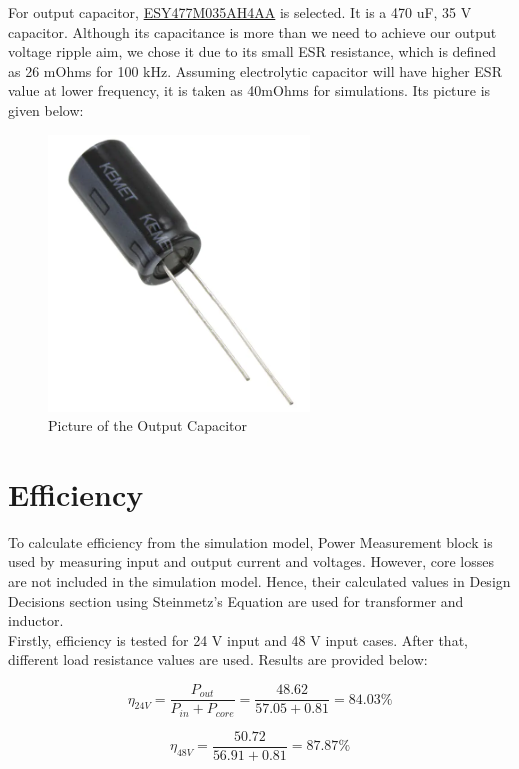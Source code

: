 \documentclass{article}
\newcommand\tab[1][1cm]{\hspace*{#1}}
\begin{document}
\tab For output capacitor, \href{https://api.kemet.com/component-edge/download/specsheet/ESY477M035AH4AA.pdf}{ESY477M035AH4AA} is selected. It is a 470 uF, 35 V capacitor. Although its capacitance is more than we need to achieve our output voltage ripple aim, we chose it due to its small ESR resistance, which is defined as 26 mOhms for 100 kHz. Assuming electrolytic capacitor will have higher ESR value at lower frequency, it is taken as 40mOhms for simulations. Its picture is given below:

\begin{figure}[H]
    \centering
    \includegraphics[scale=0.3]{capacitor.PNG}
    \caption{Picture of the Output Capacitor}
    \label{fig:my_label}
\end{figure}
\section*{Efficiency}
\tab To calculate efficiency from the simulation model, Power Measurement block is used by measuring input and output current and voltages. However, core losses are not included in the simulation model. Hence, their calculated values in Design Decisions section using Steinmetz's Equation are used for transformer and inductor. \\
\tab Firstly, efficiency is tested for 24 V input and 48 V input cases. After that, different load resistance values are used. Results are provided below:

\begin{equation*}
    \eta_{24 V}=\frac{P_{out}}{P_{in}+P_{core}}=\frac{48.62}{57.05+0.81}=84.03 \%
\end{equation*}

\begin{equation*}
    \eta_{48 V}=\frac{50.72}{56.91+0.81}=87.87 \%
\end{equation*}
\end{document}
